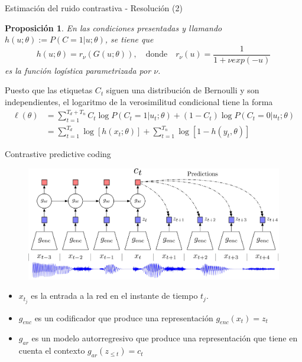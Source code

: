 \documentclass[aspectratio=169]{beamer}
\newtheorem{prop}{Proposición}
\begin{document}
  \begin{frame}{Estimación del ruido contrastiva - Resolución (2)}
  
    \begin{prop}
      En las condiciones presentadas y llamando \(h(u;\theta) := P(C = 1|u ; \theta)\), se tiene que 
      \[
      h(u;\theta) = r_\nu(G(u;\theta)), \quad \text{donde} \quad  r_\nu(u) = \frac{1}{1 + \nu exp(-u)}
      \]
      es la función logística parametrizada por \(\nu\).
      \end{prop}

      Puesto que las etiquetas \(C_t\) siguen una distribución de Bernoulli y son independientes, el logaritmo de la verosimilitud condicional tiene la forma
      \begin{align*}
        \ell(\theta) & =  \sum_{t = 1}^{T_d + T_n} C_t \log P(C_t = 1|u_t; \theta) + (1-C_t) \log P(C_t = 0|u_t;\theta)\\
        & =  \sum_{t = 1}^{T_d} \log [h(x_t;\theta)] + \sum_{t = 1}^{T_n} \log[1- h(y_t,\theta)]  
      \end{align*}

  \end{frame}
  \begin{frame}{Contrastive predictive coding}


    \begin{figure}
      \centering
      \includegraphics[scale=0.38]{contrastive_repr4.pdf}
    \end{figure}

    \begin{itemize}
      \item \(x_{t_j}\) es la entrada a la red en el instante de tiempo \(t_j\).
      \item \(g_{enc}\) es un codificador que produce una representación \(g_{enc}(x_t) = z_t\)
      \item \(g_{ar}\) es un modelo autorregresivo que produce una representación que tiene en cuenta el contexto \(g_{ar}(z_{\leq t})= c_t\)
    \end{itemize}

      

  
  \end{frame}
\end{document}
